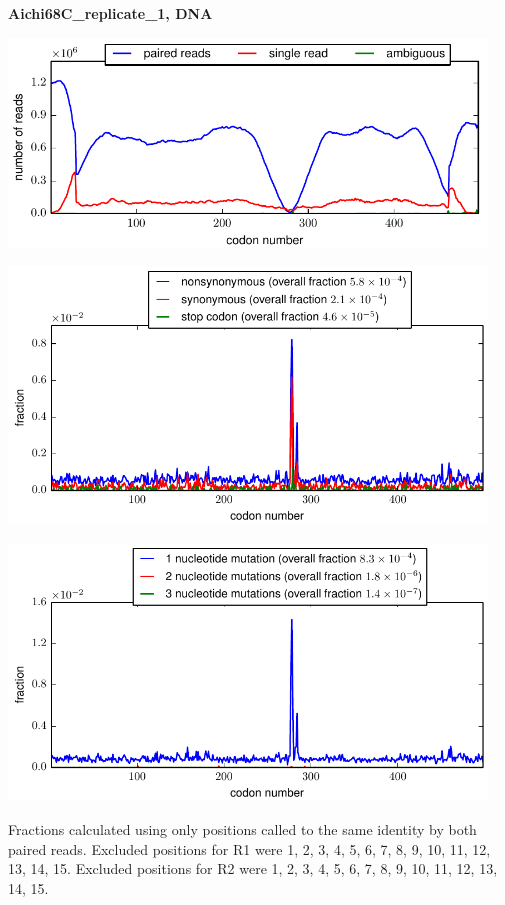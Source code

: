 \documentclass[10pt,letterpaper]{article}
\begin{document}
\centerline{\Large \bf Aichi68C\_replicate\_1, DNA}
\vspace{0.1in}

\centerline{\includegraphics[width=5in]{Aichi68C_replicate_1_DNA_codondepth.pdf}}
\vspace{0.1in}

\centerline{\includegraphics[width=5in]{Aichi68C_replicate_1_DNA_syn-ns-dist.pdf}}
\vspace{0.1in}

\centerline{\includegraphics[width=5in]{Aichi68C_replicate_1_DNA_nmutspercodon-dist.pdf}}
\vspace{0.1in}

Fractions calculated using only positions called to the same identity by both paired reads.  Excluded positions for R1 were 1, 2, 3, 4, 5, 6, 7, 8, 9, 10, 11, 12, 13, 14, 15. 
 Excluded positions for R2 were 1, 2, 3, 4, 5, 6, 7, 8, 9, 10, 11, 12, 13, 14, 15. 
\end{document}

